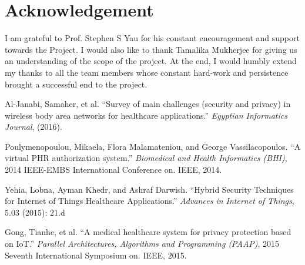 \documentclass[letterpaper, 10 pt, conference]{ieeeconf}  %
\begin{document}
\section{Acknowledgement}
I am grateful to Prof. Stephen S Yau for his constant encouragement and support towards the Project. I would also like to thank Tamalika Mukherjee for giving us an understanding of the scope of the project. At the end, I would humbly extend my thanks to all the team members whose constant hard-work and persistence brought a successful end to the project.

\begin{thebibliography}{99}

 Al-Janabi, Samaher, et al. ``Survey of main challenges (security and privacy) in wireless body area networks for healthcare applications.'' \emph{Egyptian Informatics Journal}, (2016).

 Poulymenopoulou, Mikaela, Flora Malamateniou, and George Vassilacopoulos. ``A virtual PHR authorization system.'' \emph{Biomedical and Health Informatics (BHI)}, 2014 IEEE-EMBS International Conference on. IEEE, 2014.

 Yehia, Lobna, Ayman Khedr, and Ashraf Darwish. ``Hybrid Security Techniques for Internet of Things Healthcare Applications.'' \emph{Advances in Internet of Things}, 5.03 (2015): 21.d

 Gong, Tianhe, et al. ``A medical healthcare system for privacy protection based on IoT.'' \emph{Parallel Architectures, Algorithms and Programming (PAAP)}, 2015 Seventh International Symposium on. IEEE, 2015.


\end{thebibliography}
\end{document}
